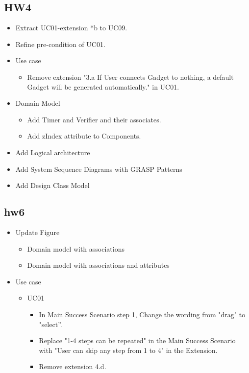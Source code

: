 \documentclass[12pt]{article}
\begin{document}
    \subsection{HW4}
    \begin{itemize}
        \item Extract UC01-extension *b to UC09.
        \item Refine pre-condition of UC01.
        \item Use case
        \begin{itemize}
            \item Remove extension "3.a If User connects Gadget to nothing, a default Gadget will be generated automatically." in UC01.
        \end{itemize}
        \item Domain Model
        \begin{itemize}
            \item Add Timer and Verifier and their associates.
            \item Add zIndex attribute to Components.
        \end{itemize}
        \item Add Logical architecture
        \item Add System Sequence Diagrams with GRASP Patterns
        \item Add Design Class Model
    \end{itemize}

    \subsection{hw6}
    \begin{itemize}
        \item Update Figure
        \begin{itemize}
            \item Domain model with associations
            \item Domain model with associations and attributes
        \end{itemize}
        \item Use case
        \begin{itemize}
            \item UC01
            \begin{itemize}
                \item In Main Success Scenario step 1, Change the wording from "drag" to "select''.
                \item  Replace  "1-4 steps can be repeated" in the Main Success Scenario with
                "User can skip any step from 1 to 4" in the Extension.
                \item Remove extension 4.d.
            \end{itemize}
        \end{itemize}
    \end{itemize}
    
\end{document}
